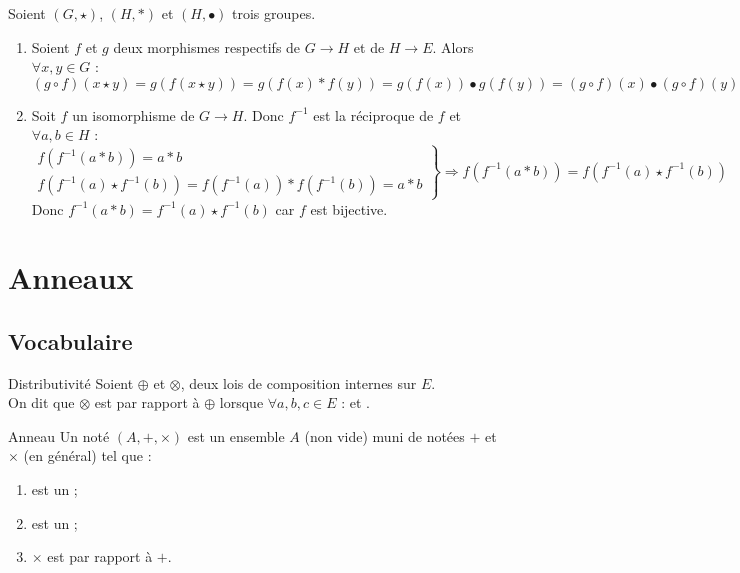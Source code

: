 \documentclass[12pt,a4paper]{report}
\begin{document}
    \begin{demo}
    Soient $(G, \star)$, $(H, \ast)$ et $(H, \bullet)$ trois groupes.
    \begin{enumerate}[label=\bfseries\arabic*)]
        \item Soient $f$ et $g$ deux morphismes respectifs de $G \rightarrow H$ et de $H \rightarrow E$. Alors $\forall x, y \in G$ :
        $$ (g \circ f)(x \star y) = g(f(x \star y)) = g(f(x) \ast f(y)) = g(f(x)) \bullet g(f(y)) = (g \circ f)(x) \bullet (g \circ f)(y) $$
        \item Soit $f$ un isomorphisme de $G \rightarrow H$. Donc $f^{-1}$ est la réciproque de $f$ et $\forall a, b \in H$ :
        $$ \left.\begin{array}{r}
        f\left(f^{-1}(a \ast b)\right) = a \ast b \\
        f\left(f^{-1}(a) \star f^{-1}(b)\right) = f\left(f^{-1}(a)\right) \ast f\left(f^{-1}(b)\right) = a \ast b
        \end{array}\right\}
        \Rightarrow f\left(f^{-1}(a \ast b)\right) = f\left(f^{-1}(a) \star f^{-1}(b)\right) $$
        Donc $f^{-1}(a \ast b) = f^{-1}(a) \star f^{-1}(b)$ car $f$ est bijective.
    \end{enumerate}
    \end{demo}

\pagebreak

\section{Anneaux}

    \subsection{Vocabulaire}

    \begin{definition}{Distributivité}{}
    Soient $\oplus$ et $\otimes$, deux lois de composition internes sur $E$.\\
    On dit que $\otimes$ est  par rapport à $\oplus$ lorsque $\forall a, b, c \in E$ :  et .
    \end{definition}
    
    \begin{definition}{Anneau}{}
    Un  noté $(A, +, \times)$ est un ensemble $A$ (non vide) muni de  notées $+$ et $\times$ (en général) tel que :
    \begin{multicols}{2}
    \begin{enumerate}[label=\bfseries\arabic*)]
        \item {} est un  ;
        \item {} est un  ;
        \item $\times$ est  par rapport à $+$.
    \end{enumerate}
    \end{multicols}
    \end{definition}
    
\end{document}
